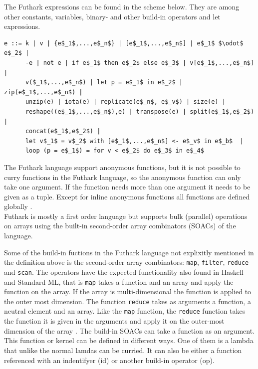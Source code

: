 \documentclass[11pt]{article}
\begin{document}
The Futhark expressions can be found in the scheme below. They are among other constants, variables, binary- and other build-in operators and let expressions.

\begin{lstlisting}[numbers=none,frame=none]
e ::= k | v | {e$_1$,...,e$_n$} | [e$_1$,...,e$_n$] | e$_1$ $\odot$ e$_2$ |
      -e | not e | if e$_1$ then e$_2$ else e$_3$ | v[e$_1$,...,e$_n$] |
      v($_1$,...,e$_n$) | let p = e$_1$ in e$_2$ | zip(e$_1$,...,e$_n$) | 
      unzip(e) | iota(e) | replicate(e$_n$, e$_v$) | size(e) |
      reshape((e$_1$,...,e$_n$),e) | transpose(e) | split(e$_1$,e$_2$) |
      concat(e$_1$,e$_2$) | 
      let v$_1$ = v$_2$ with [e$_1$,...,e$_n$] <- e$_v$ in e$_b$  |
      loop (p = e$_1$) = for v < e$_2$ do e$_3$ in e$_4$
\end{lstlisting}


The Futhark language support anonymous functions, but it is not possible to curry functions in the Futhark language,
so the anonymous function can only take one argument.
If the function needs more than one argument it needs to be given as a tuple.
Except for inline anonymous functions all functions are defined globally \cite{TroelsHenriksen}. \\

Futhark is mostly a first order language but supports bulk (parallel) operations on arrays
using the built-in second-order array combinators (SOACs) of the language. 

Some of the build-in fuctions in the Futhark language not explixitly mentioned in the definition above 
 is the second-order array combinators: 
{\tt map}, {\tt filter}, {\tt reduce} and {\tt scan}.
The operators have the expected functionality also found in Haskell and Standard ML,
that is {\tt map} takes a function and an array and apply the function on the array.
If the array is multi-dimensional the function is applied to the outer most dimension.
The function {\tt reduce} takes as arguments a function, a neutral element and an array.
Like the {\tt map} function, the {\tt reduce} function takes the function it is given in the arguments
and apply it on the outer-most dimension of the array \cite{TroelsHenriksen}. 
The build-in SOACs can take a function as an argument. This function or kernel can be defined in 
different ways. One of them is a lambda that unlike the normal lamdas can be curried. It can also be either a function 
referenced with an indentifyer (id) or another build-in operator (op).
\end{document}
